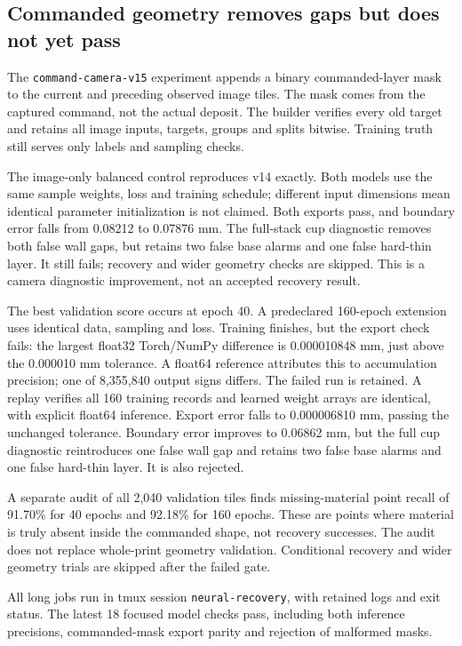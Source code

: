 \documentclass[10pt,letterpaper]{article}
\begin{document}
\subsection*{Commanded geometry removes gaps but does not yet pass}
The \texttt{command-camera-v15} experiment appends a binary commanded-layer
mask to the current and preceding observed image tiles. The mask comes from the
captured command, not the actual deposit. The builder verifies every old target
and retains all image inputs, targets, groups and splits bitwise. Training truth
still serves only labels and sampling checks.

The image-only balanced control reproduces v14 exactly. Both models use the same
sample weights, loss and training schedule; different input dimensions mean
identical parameter initialization is not claimed. Both exports pass, and boundary
error falls from 0.08212 to 0.07876 mm. The full-stack cup diagnostic removes both
false wall gaps, but retains two false base alarms and one false hard-thin layer.
It still fails; recovery and wider geometry checks are skipped. This is a camera
diagnostic improvement, not an accepted recovery result.

The best validation score occurs at epoch 40. A predeclared 160-epoch extension
uses identical data, sampling and loss. Training finishes, but the
export check fails: the largest float32 Torch/NumPy difference is 0.000010848 mm,
just above the 0.000010 mm tolerance. A float64 reference attributes this to
accumulation precision; one of 8,355,840 output signs differs. The failed run is
retained. A replay verifies all 160 training records and learned weight arrays
are identical, with explicit float64 inference. Export error falls to
0.000006810 mm, passing the unchanged tolerance. Boundary error improves to
0.06862 mm, but the full cup diagnostic reintroduces one false wall gap and retains
two false base alarms and one false hard-thin layer. It is also rejected.

A separate audit of all 2,040 validation tiles finds missing-material point
recall of 91.70\% for 40 epochs and 92.18\% for 160 epochs. These are points where
material is truly absent inside the commanded shape, not recovery successes.
The audit does not replace whole-print geometry validation. Conditional recovery
and wider geometry trials are skipped after the failed gate.

All long jobs run in tmux session \texttt{neural-recovery}, with retained logs and
exit status. The latest 18 focused model checks pass, including both inference
precisions, commanded-mask export parity and rejection of malformed masks.
\end{document}
